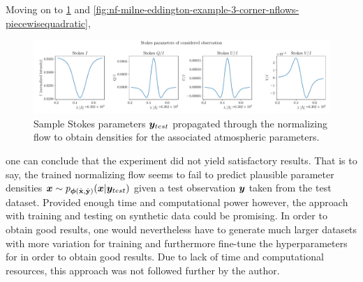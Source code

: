 \documentclass[a4paper,12pt]{report}
\begin{document}
Moving on to \cref{fig:nf-milne-eddington-example-3-corner-spectrum-nf-nflows-piecewisequadratic} and \cref{fig:nf-milne-eddington-example-3-corner-nflows-piecewisequadratic}, 
\begin{figure}[h]
\centering
\includegraphics[width=\textwidth]{figures/nf-milne-eddington-example-3-corner-spectrum-nf-nflows-piecewisequadratic.pdf}
\caption{Sample Stokes parameters $\bm{y}_{test}$ propagated through the normalizing flow to obtain densities for the associated atmospheric parameters.}
\label{fig:nf-milne-eddington-example-3-corner-spectrum-nf-nflows-piecewisequadratic}
\end{figure}
one can conclude that the experiment did not yield satisfactory results. That is to say, the trained normalizing flow seems to fail to predict plausible parameter densities $\bm{x} \sim p_{\bm{\phi}(\hat{\boldsymbol{\mathbf{x}}}, \hat{\boldsymbol{\mathbf{y}}})}(\bm{x}|\bm{y}_{test})$ given a test observation $\bm{y}$ taken from the test dataset. Provided enough time and computational power however, the approach with training and testing on synthetic data could be promising. In order to obtain good results, one would nevertheless have to generate much larger datasets with more variation for training and furthermore fine-tune the hyperparameters for in order to obtain good results. Due to lack of time and computational resources, this approach was not followed further by the author. 
\end{document}
